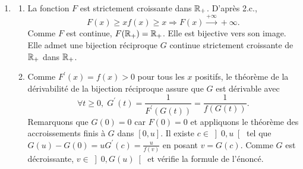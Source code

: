 \begin{enumerate}
  \item 
  \begin{enumerate}
    \item La fonction $F$ est strictement croissante dans $\mathbb{R}_{+}$. D'apr{\`e}s 2.c.,
\begin{displaymath}
F(x)\geq xf(x)\geq x \Rightarrow F(x) \xrightarrow{+\infty} +\infty .
\end{displaymath}
Comme $F$ est continue, $F(\mathbb{R}_{+})=\mathbb{R}_{+}$. Elle est bijective vers son image. Elle admet une bijection r{\'e}ciproque $G$ continue strictement croissante de $\mathbb{R}_{+}$ dans $\mathbb{R}_{+}$.

    \item Comme $F^{\prime }(x)=f(x)>0$ pour tous les $x$ positifs, le théorème de la dérivabilité de la bijection réciproque assure que $G$ est dérivable avec
\[
\forall t\geq 0,\; G^{\prime }(t)=\frac{1}{F^{\prime }(G(t))}=\frac{1}{f(G(t))}.
\]
Remarquons que $G(0)=0$ car $F(0)=0$ et appliquons le th{\'e}or{\`e}me des accroissements finis {\`a} $G$ dans $\left[ 0,u\right] $. Il existe $c\in \left] 0,u\right[ $ tel que $G(u)-G(0) = uG^{\prime }(c) = \frac{u}{f(v)}$ en posant $v=G(c)$. Comme $G$ est d{\'e}croissante, $v\in \left] 0,G(u)\right[ $ et v{\'e}rifie la formule de l'{\'e}nonc{\'e}.
  \end{enumerate}
\end{enumerate}

